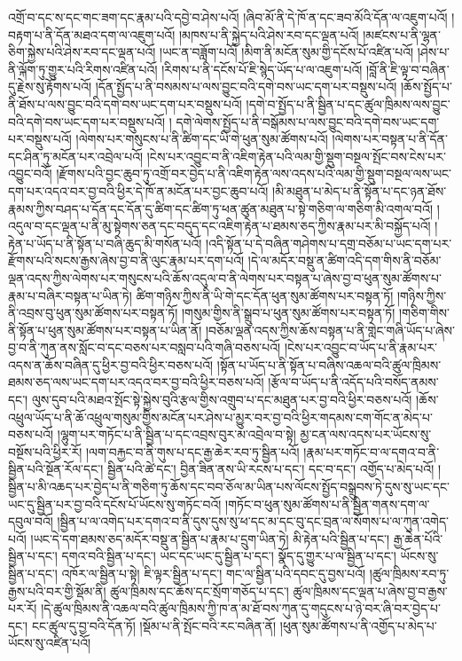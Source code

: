 འགྲོ་བ་དང་ས་དང་གང་ཟག་དང་རྣམ་པའི་དབྱེ་བ་ཤེས་པའོ། །ཞིབ་མོ་ནི་དེ་ཁོ་ན་དང་ཟབ་མོའི་དོན་ལ་འཇུག་པའོ། །བརྟག་པ་ནི་དོན་མཐའ་དག་ལ་འཇུག་པའོ། །མཁས་པ་ནི་སྐྱེད་པའི་ཤེས་རབ་དང་ལྡན་པའོ། །མཛངས་པ་ནི་ལྷན་ཅིག་སྐྱེས་པའི་ཤེས་རབ་དང་ལྡན་པའོ། །ཡང་ན་བཟློག་པའོ། །མིག་ནི་མངོན་སུམ་གྱི་དངོས་པོ་འཛིན་པའོ། །ཤེས་པ་ནི་ལྐོག་ཏུ་གྱུར་པའི་རིགས་འཛིན་པའོ། །རིགས་པ་ནི་དངོས་པོ་ཇི་སྙེད་ཡོད་པ་ལ་འཇུག་པའོ། །བློ་ནི་ཇི་ལྟ་བ་བཞིན་དུ་རྗེས་སུ་རྟོགས་པའོ། །དོན་སྤྱོད་པ་ནི་བསམས་པ་ལས་བྱུང་བའི་དགེ་བས་ཡང་དག་པར་བསྡུས་པའོ། །ཆོས་སྤྱོད་པ་ནི་ཐོས་པ་ལས་བྱུང་བའི་དགེ་བས་ཡང་དག་པར་བསྡུས་པའོ། །དགེ་བ་སྤྱོད་པ་ནི་སྦྱིན་པ་དང་ཚུལ་ཁྲིམས་ལས་བྱུང་བའི་དགེ་བས་ཡང་དག་པར་བསྡུས་པའོ། །
དགེ་ལེགས་སྤྱོད་པ་ནི་བསྒོམས་པ་ལས་བྱུང་བའི་དགེ་བས་ཡང་དག་པར་བསྡུས་པའོ། །ལེགས་པར་གསུངས་པ་ནི་ཚིག་དང་ཡི་གེ་ཕུན་སུམ་ཚོགས་པའོ། །ལེགས་པར་བསྟན་པ་ནི་དོན་དང་ཤིན་ཏུ་མངོན་པར་འབྲེལ་པའོ། །ངེས་པར་འབྱུང་བ་ནི་འཇིག་རྟེན་པའི་ལམ་གྱི་སྡུག་བསྔལ་སྤོང་བས་ངེས་པར་འབྱུང་བའོ། །རྫོགས་པའི་བྱང་ཆུབ་ཏུ་འགྲོ་བར་བྱེད་པ་ནི་འཇིག་རྟེན་ལས་འདས་པའི་ལམ་གྱི་སྡུག་བསྔལ་ལས་ཡང་དག་པར་འདའ་བར་བྱ་བའི་ཕྱིར་དེ་ཁོ་ན་མངོན་པར་བྱང་ཆུབ་པའོ། །མི་མཐུན་པ་མེད་པ་ནི་སྟོན་པ་དང་ཉན་ཐོས་རྣམས་ཀྱིས་བཤད་པ་དོན་དང་དོན་དུ་ཚིག་དང་ཚིག་ཏུ་ཕན་ཚུན་མཐུན་པ་སྟེ་གཅིག་ལ་གཅིག་མི་འགལ་བའོ། །འདུལ་བ་དང་ལྡན་པ་ནི་མུ་སྟེགས་ཅན་དང་བདུད་དང་འཇིག་རྟེན་པ་ཐམས་ཅད་ཀྱིས་རྣམ་པར་མི་བསྐྱོད་པའོ། །རྟེན་པ་ཡོད་པ་ནི་སྟོན་པ་བཞི་ཆུད་མི་གསོན་པའོ། །འདི་སྟོན་པ་དེ་བཞིན་གཤེགས་པ་དགྲ་བཅོམ་པ་ཡང་དག་པར་རྫོགས་པའི་སངས་རྒྱས་ཞེས་བྱ་བ་ནི་ལུང་རྣམ་པར་དག་པའོ། །དེ་ལ་མདོར་བསྡུ་ན་ཚིག་འདི་དག་གིས་ནི་བཅོམ་ལྡན་འདས་ཀྱིས་ལེགས་པར་གསུངས་པའི་ཆོས་འདུལ་བ་ནི་ལེགས་པར་བསྟན་པ་ཞེས་བྱ་བ་ཕུན་སུམ་ཚོགས་པ་རྣམ་པ་བཞིར་བསྟན་པ་ཡིན་ཏེ། ཚིག་གཉིས་ཀྱིས་ནི་ཡི་གེ་དང་དོན་ཕུན་སུམ་ཚོགས་པར་བསྟན་ཏོ། །གཉིས་ཀྱིས་ནི་འབྲས་བུ་ཕུན་སུམ་ཚོགས་པར་བསྟན་ཏོ། །གསུམ་གྱིས་ནི་སྒྲུབ་པ་ཕུན་སུམ་ཚོགས་པར་བསྟན་ཏོ། །གཅིག་གིས་ནི་སྟོན་པ་ཕུན་སུམ་ཚོགས་པར་བསྟན་པ་ཡིན་ནོ། །བཅོམ་ལྡན་འདས་ཀྱིས་ཆོས་བསྟན་པ་ནི་གླེང་གཞི་ཡོད་པ་ཞེས་བྱ་བ་ནི་ཀུན་ནས་སློང་བ་དང་བཅས་པར་བསླབ་པའི་གཞི་བཅས་པའོ། །ངེས་པར་འབྱུང་བ་ཡོད་པ་ནི་རྣམ་པར་འདས་ན་ཆོས་བཞིན་དུ་ཕྱིར་བྱ་བའི་ཕྱིར་བཅས་པའོ། །སྟོན་པ་ཡོད་པ་ནི་སྟོན་པ་བཞིས་འཆལ་བའི་ཚུལ་ཁྲིམས་ཐམས་ཅད་ལས་ཡང་དག་པར་འདའ་བར་བྱ་བའི་ཕྱིར་བཅས་པའོ། །རྩོལ་བ་ཡོད་པ་ནི་འདོད་པའི་བསོད་ནམས་དང་། ལུས་དུབ་པའི་མཐའ་སྤོང་སྟེ་སྐྱེས་བུའི་རྩལ་གྱིས་འགྲུབ་པ་དང་མཐུན་པར་བྱ་བའི་ཕྱིར་བཅས་པའོ། །ཆོས་འཕྲུལ་ཡོད་པ་ནི་ཆོ་འཕྲུལ་གསུམ་གྱིས་མངོན་པར་ཤེས་པ་མྱུར་བར་བྱ་བའི་ཕྱིར་གདམས་ངག་གོང་ན་མེད་པ་བཅས་པའོ། །ལྷུག་པར་གཏོང་པ་ནི་སྦྱིན་པ་དང་འབྲས་བུར་མ་འབྲེལ་བ་སྟེ། མྱ་ངན་ལས་འདས་པར་ཡོངས་སུ་བསྔོས་པའི་ཕྱིར་རོ། །ལག་བརྐྱང་བ་ནི་གུས་པ་དང་རྒྱ་ཆེར་རབ་ཏུ་སྦྱིན་པའོ། །རྣམ་པར་གཏོང་བ་ལ་དགའ་བ་ནི་སྦྱིན་པའི་སྔོན་རོལ་དང་། སྦྱིན་པའི་ཚེ་དང་། བྱིན་ཟིན་ནས་ཡི་རངས་པ་དང་། དང་བ་དང་། འགྱོད་པ་མེད་པའོ། །སྦྱིན་པ་མི་འཆད་པར་བྱེད་པ་ནི་གཅིག་ཏུ་ཆོས་དང་བབ་ཅོལ་མ་ཡིན་པས་ལོངས་སྤྱོད་བསྒྲུབས་ཏེ་དུས་སུ་ཡང་དང་ཡང་དུ་སྦྱིན་པར་བྱ་བའི་དངོས་པོ་ཡོངས་སུ་གཏོང་བའོ། །གཏོང་བ་ཕུན་སུམ་ཚོགས་པ་ནི་སྦྱིན་གནས་དག་ལ་དབུལ་བའོ། །སྦྱིན་པ་ལ་འགེད་པར་དགའ་བ་ནི་དུས་དུས་སུ་ཕ་དང་མ་དང་བུ་དང་བྲན་ལ་སོགས་པ་ལ་ཀུན་འགེད་པའོ། །ཡང་དེ་དག་ཐམས་ཅད་མདོར་བསྡུ་ན་སྦྱིན་པ་རྣམ་པ་དྲུག་ཡིན་ཏེ། མི་རྟེན་པའི་སྦྱིན་པ་དང་། རྒྱ་ཆེན་པོའི་སྦྱིན་པ་དང་། དགའ་བའི་སྦྱིན་པ་དང་། ཡང་དང་ཡང་དུ་སྦྱིན་པ་དང་། སྣོད་དུ་གྱུར་པ་ལ་སྦྱིན་པ་དང་། ཡོངས་སུ་སྦྱིན་པ་དང་། འཁོར་ལ་སྦྱིན་པ་སྟེ། ཇི་ལྟར་སྦྱིན་པ་དང་། གང་ལ་སྦྱིན་པའི་དབང་དུ་བྱས་པའོ། །ཚུལ་ཁྲིམས་རབ་ཏུ་རྒྱས་པའི་བར་གྱི་སྡོམ་ནི། ཚུལ་ཁྲིམས་དང་ཆོས་དང་སྲོག་གཅོད་པ་དང་། ཚུལ་ཁྲིམས་དང་ལྡན་པ་ཞེས་བྱ་བ་རྒྱས་པར་རོ། །དེ་ཚུལ་ཁྲིམས་ནི་འཆལ་བའི་ཚུལ་ཁྲིམས་ཀྱི་ཁ་ན་མ་ཐོ་བས་ཀུན་དུ་གདུངས་པ་ཉེ་བར་ཞི་བར་བྱེད་པ་དང་། ངང་ཚུལ་དུ་བྱ་བའི་དོན་ཏོ། །སྡོམ་པ་ནི་སྤོང་བའི་རང་བཞིན་ནོ། །ཕུན་སུམ་ཚོགས་པ་ནི་འགྱོད་པ་མེད་པ་ཡོངས་སུ་འཛིན་པའོ། 